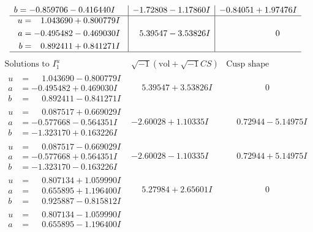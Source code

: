 \documentclass[1p]{elsarticle_modified}
\theoremstyle{definition}
\newcommand{\I}{\sqrt{-1}}
\begin{document}
$$\begin{array}{c|c|c}
\begin{aligned}
b &= -0.859706 - 0.416440 I\end{aligned}
 & -1.72808 - 1.17860 I & -0.84051 + 1.97476 I \\ \hline\begin{aligned}
u &= \phantom{-}1.043690 + 0.800779 I \\
a &= -0.495482 - 0.469030 I \\
b &= \phantom{-}0.892411 + 0.841271 I\end{aligned}
 & \phantom{-}5.39547 - 3.53826 I & \phantom{-0.000000 } 0\\
 \hline 
 \end{array}$$\newpage$$\begin{array}{c|c|c}  
\text{Solutions to }I^u_{1}& \I (\text{vol} + \sqrt{-1}CS) & \text{Cusp shape}\\
 \hline 
\begin{aligned}
u &= \phantom{-}1.043690 - 0.800779 I \\
a &= -0.495482 + 0.469030 I \\
b &= \phantom{-}0.892411 - 0.841271 I\end{aligned}
 & \phantom{-}5.39547 + 3.53826 I & \phantom{-0.000000 } 0 \\ \hline\begin{aligned}
u &= \phantom{-}0.087517 + 0.669029 I \\
a &= -0.577668 - 0.564351 I \\
b &= -1.323170 + 0.163226 I\end{aligned}
 & -2.60028 + 1.10335 I & \phantom{-}0.72944 - 5.14975 I \\ \hline\begin{aligned}
u &= \phantom{-}0.087517 - 0.669029 I \\
a &= -0.577668 + 0.564351 I \\
b &= -1.323170 - 0.163226 I\end{aligned}
 & -2.60028 - 1.10335 I & \phantom{-}0.72944 + 5.14975 I \\ \hline\begin{aligned}
u &= \phantom{-}0.807134 + 1.059990 I \\
a &= \phantom{-}0.655895 + 1.196400 I \\
b &= \phantom{-}0.925887 - 0.815812 I\end{aligned}
 & \phantom{-}5.27984 + 2.65601 I & \phantom{-0.000000 } 0 \\ \hline\begin{aligned}
u &= \phantom{-}0.807134 - 1.059990 I \\
a &= \phantom{-}0.655895 - 1.196400 I \\

\end{aligned}
\end{array}$$
\end{document}
